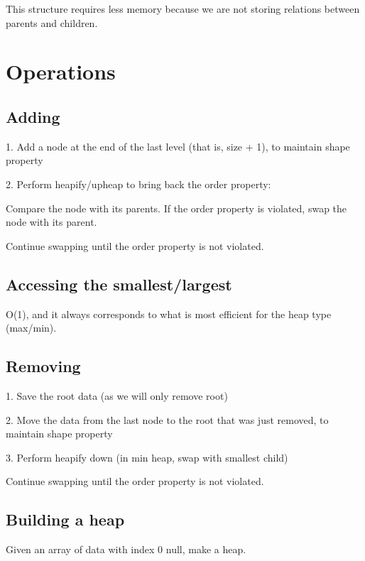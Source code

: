 \documentclass[english,openany]{book}
\begin{document}
	This structure requires less memory because we are not storing relations between parents and children.\\

	\section{Operations}

	\subsection{Adding}

	1. Add a node at the end of the last level (that is, size + 1), to maintain shape property

	2. Perform heapify/upheap to bring back the order property:

	Compare the node with its parents. If the order property is violated, swap the node with its parent.

	Continue swapping until the order property is not violated.\\

	\subsection{Accessing the smallest/largest}

	O(1), and it always corresponds to what is most efficient for the heap type (max/min).\\

	\subsection{Removing}

	1. Save the root data (as we will only remove root)

	2. Move the data from the last node to the root that was just removed, to maintain shape property

	3. Perform heapify down (in min heap, swap with smallest child)

	Continue swapping until the order property is not violated.\\

	\subsection{Building a heap}

	Given an array of data with index 0 null, make a heap.
\end{document}
